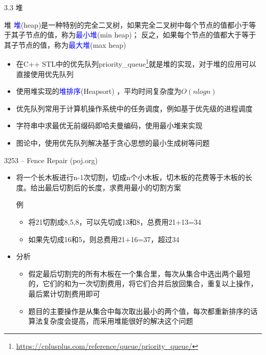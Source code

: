 \begin{frame}{3.3 堆}
    \begin{block}{堆}
        \textcolor{blue}{堆}(heap)是一种特别的完全二叉树，如果完全二叉树中每个节点的值都小于等于其子节点的值，称为\textcolor{blue}{最小堆}(min heap)； 反之，如果每个节点的值都大于等于其子节点的值，称为\textcolor{blue}{最大堆}(max heap)
    \end{block}
    \begin{itemize}
        \item 在C++ STL中的优先队列priority\_queue\footnote{\url{https://cplusplus.com/reference/queue/priority_queue/}}就是堆的实现，对于堆的应用可以直接使用优先队列
        \item 使用堆实现的\textcolor{blue}{堆排序}(Heapsort) ，平均时间复杂度为$O(nlogn)$
        \item 优先队列常用于计算机操作系统中的任务调度，例如基于优先级的进程调度
        \item 字符串中求最优无前缀码即哈夫曼编码，使用最小堆来实现
        \item 图论中，使用优先队列解决基于贪心思想的最小生成树等问题
    \end{itemize}
\end{frame} 
\begin{frame}{3253 -- Fence Repair (poj.org)}
    \begin{itemize}
        \item 将一个长木板进行n-1次切割，切成n个小木板，切木板的花费等于木板的长度。给出最后切割后的长度，求费用最小的切割方案
        \begin{exampleblock}{例}
            \begin{itemize}
                \item 将21切割成8,5,8，可以先切成13和8，总费用21+13=34
                \item 如果先切成16和5，则总费用21+16=37，超过34
            \end{itemize}
        \end{exampleblock}
        \item 分析
        \begin{itemize}
            \item 假定最后切割完的所有木板在一个集合里，每次从集合中选出两个最短的，它们的和为一次切割费用，将它们合并后放回集合，重复以上操作，最后累计切割费用即可
            \item 题目的主要操作是从集合中每次取出最小的两个值，每次都重新排序的话算法复杂度会提高，而采用堆能很好的解决这个问题
        \end{itemize}
    \end{itemize}
\end{frame}


